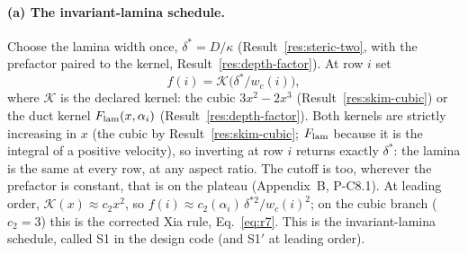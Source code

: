 \paragraph{(a) The invariant-lamina schedule.} Choose the lamina width once, $\delta^*=D/\kappa$
(Result~\ref{res:steric-two}, with the prefactor paired to the kernel, Result~\ref{res:depth-factor}).
At row $i$ set
\begin{equation}
f(i)=\mathcal{K}\big(\delta^*/w_c(i)\big),
\end{equation}
where $\mathcal{K}$ is the declared kernel: the cubic $3x^2-2x^3$ (Result~\ref{res:skim-cubic})
or the duct kernel $F_{\mathrm{lam}}(x,\alpha_i)$ (Result~\ref{res:depth-factor}). Both kernels are strictly
increasing in $x$ (the cubic by Result~\ref{res:skim-cubic}; $F_{\mathrm{lam}}$ because it is the integral
of a positive velocity), so inverting at row $i$ returns exactly $\delta^*$: the lamina is the same at every row, at any
aspect ratio. The cutoff is too, wherever the prefactor is constant, that is on the plateau
(Appendix~B, P-C8.1). At leading order,
$\mathcal{K}(x)\approx c_2x^2$, so $f(i)\approx c_2(\alpha_i)\,\delta^{*2}/w_c(i)^2$; on the cubic
branch ($c_2=3$) this is the corrected Xia rule, Eq.~\eqref{eq:r7}. This is the invariant-lamina
schedule, called S1 in the design code (and S1$'$ at leading order).

